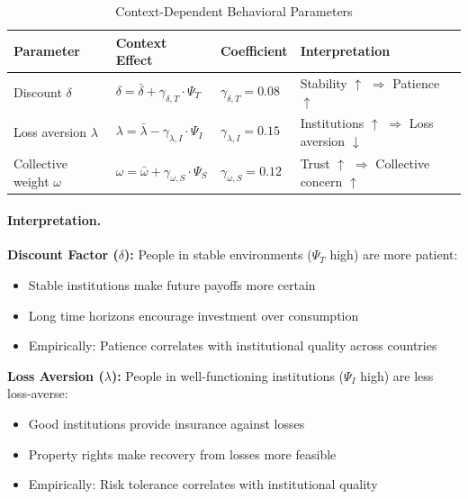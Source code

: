 \begin{table}[htbp]
\centering
\caption{Context-Dependent Behavioral Parameters}
\label{tab:app-c-context-parameters}
\renewcommand{\arraystretch}{1.4}
\begin{tabular}{@{}llll@{}}
\toprule
\textbf{Parameter} & \textbf{Context Effect} & \textbf{Coefficient} & \textbf{Interpretation} \\
\midrule
Discount $\delta$ & $\delta = \bar{\delta} + \gamma_{\delta,T} \cdot \Psi_T$ & $\gamma_{\delta,T} = 0.08$ & Stability $\uparrow$ $\Rightarrow$ Patience $\uparrow$ \\
Loss aversion $\lambda$ & $\lambda = \bar{\lambda} - \gamma_{\lambda,I} \cdot \Psi_I$ & $\gamma_{\lambda,I} = 0.15$ & Institutions $\uparrow$ $\Rightarrow$ Loss aversion $\downarrow$ \\
Collective weight $\omega$ & $\omega = \bar{\omega} + \gamma_{\omega,S} \cdot \Psi_S$ & $\gamma_{\omega,S} = 0.12$ & Trust $\uparrow$ $\Rightarrow$ Collective concern $\uparrow$ \\
\bottomrule
\end{tabular}
\end{table}

\paragraph{Interpretation.}

\textbf{Discount Factor ($\delta$):}
People in stable environments ($\Psi_T$ high) are more patient:
\begin{itemize}
\item Stable institutions make future payoffs more certain
\item Long time horizons encourage investment over consumption
\item Empirically: Patience correlates with institutional quality across countries
\end{itemize}

\textbf{Loss Aversion ($\lambda$):}
People in well-functioning institutions ($\Psi_I$ high) are less loss-averse:
\begin{itemize}
\item Good institutions provide insurance against losses
\item Property rights make recovery from losses more feasible
\item Empirically: Risk tolerance correlates with institutional quality
\end{itemize}


